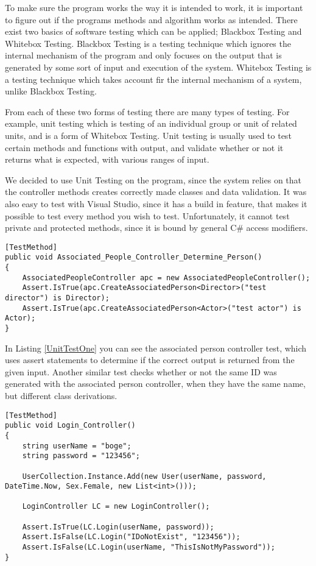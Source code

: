 To make sure the program works the way it is intended to work, it is important to figure out if the programs methods and algorithm works as intended. There exist two basics of software testing which can be applied; Blackbox Testing and Whitebox Testing. Blackbox Testing is a testing technique which ignores the internal mechanism of the program and only focuses on the output that is generated by some sort of input and execution of the system. Whitebox Testing is a testing technique which takes account fir the internal mechanism of a system, unlike Blackbox Testing.

From each of these two forms of testing there are many types of testing. For example, unit testing which is testing of an individual group or unit of related units, and is a form of Whitebox Testing. Unit testing is usually used to test certain methods and functions with output, and validate whether or not it returns what is expected, with various ranges of input. \cite{Testing}

We decided to use Unit Testing on the program, since the system relies on that the controller methods creates correctly made classes and data validation. It was also easy to test with Visual Studio, since it has a build in feature, that makes it possible to test every method you wish to test. Unfortunately, it cannot test private and protected methods, since it is bound by general C\# access modifiers.

\begin{lstlisting}[caption={A unit test which tests the associated person controller},label={UnitTestOne}]
[TestMethod]
public void Associated_People_Controller_Determine_Person()
{
	AssociatedPeopleController apc = new AssociatedPeopleController();
	Assert.IsTrue(apc.CreateAssociatedPerson<Director>("test director") is Director);
	Assert.IsTrue(apc.CreateAssociatedPerson<Actor>("test actor") is Actor);
}
\end{lstlisting}

In Listing \ref{UnitTestOne} you can see the associated person controller test, which uses assert statements to determine if the correct output is returned from the given input. Another similar test checks whether or not the same ID was generated with the associated person controller, when they have the same name, but different class derivations.

\begin{lstlisting}[caption={A unit test which tests the login controller},label={UnitTestTwo}]
[TestMethod] 
public void Login_Controller()
{
	string userName = "boge";
	string password = "123456";

	UserCollection.Instance.Add(new User(userName, password, DateTime.Now, Sex.Female, new List<int>()));

	LoginController LC = new LoginController();

	Assert.IsTrue(LC.Login(userName, password));
	Assert.IsFalse(LC.Login("IDoNotExist", "123456"));
	Assert.IsFalse(LC.Login(userName, "ThisIsNotMyPassword"));
}
\end{lstlisting}


